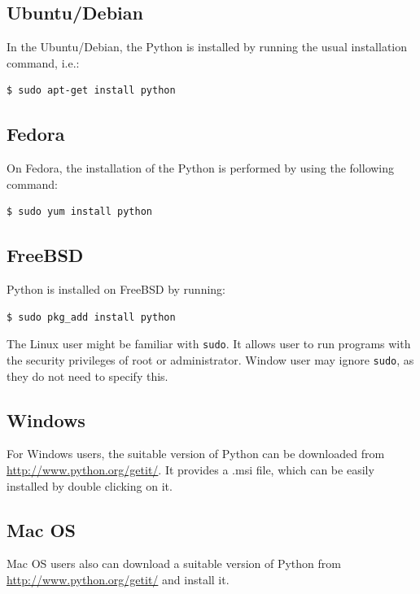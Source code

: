 \documentclass[10pt]{book}
\begin{document}

\subsection{Ubuntu/Debian}
In the Ubuntu/Debian, the Python is installed by running the usual installation command, i.e.:
\beforeverb
\begin{verbatim}
$ sudo apt-get install python
\end{verbatim}
\afterverb


\subsection{Fedora}
On Fedora, the installation of the Python is performed by using the following command:
\beforeverb
\begin{verbatim}
$ sudo yum install python
\end{verbatim}
\afterverb


\subsection{FreeBSD}
Python is installed on FreeBSD by running:
\beforeverb
\begin{verbatim}
$ sudo pkg_add install python
\end{verbatim}
\afterverb
{}

The Linux user might be familiar with \verb"sudo". 
It allows user to run programs with the security privileges of root or administrator. 
Window user may ignore \verb"sudo", as they do not need to specify this. \\

\subsection{Windows}
For Windows users, the suitable version of Python can be downloaded 
from \url{http://www.python.org/getit/}. 
It provides a .msi file, which can be easily installed by double clicking on it. \\

\subsection{Mac OS}
Mac OS users also can download a suitable version of Python from 
\url{http://www.python.org/getit/} and install it.
\end{document}

